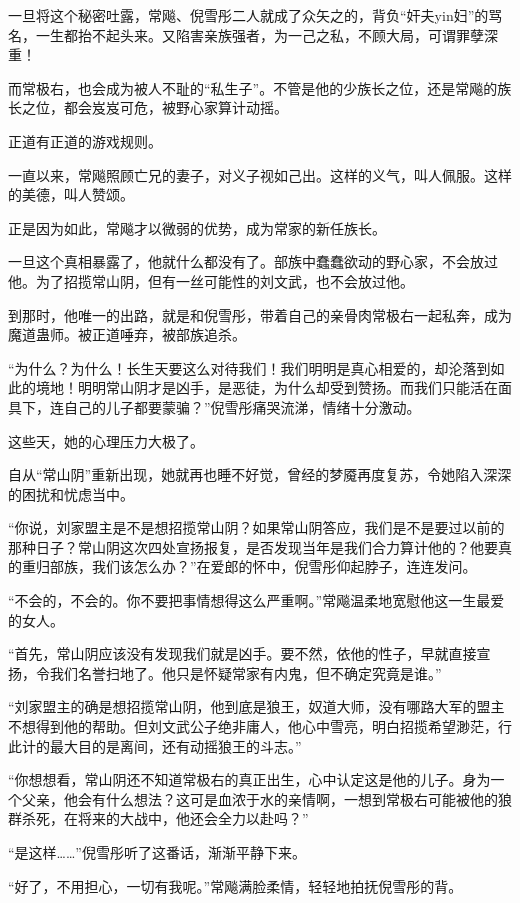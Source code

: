 \begin{this_body}
一旦将这个秘密吐露，常飚、倪雪彤二人就成了众矢之的，背负“奸夫yin妇”的骂名，一生都抬不起头来。又陷害亲族强者，为一己之私，不顾大局，可谓罪孽深重！

而常极右，也会成为被人不耻的“私生子”。不管是他的少族长之位，还是常飚的族长之位，都会岌岌可危，被野心家算计动摇。

正道有正道的游戏规则。

一直以来，常飚照顾亡兄的妻子，对义子视如己出。这样的义气，叫人佩服。这样的美德，叫人赞颂。

正是因为如此，常飚才以微弱的优势，成为常家的新任族长。

一旦这个真相暴露了，他就什么都没有了。部族中蠢蠢欲动的野心家，不会放过他。为了招揽常山阴，但有一丝可能性的刘文武，也不会放过他。

到那时，他唯一的出路，就是和倪雪彤，带着自己的亲骨肉常极右一起私奔，成为魔道蛊师。被正道唾弃，被部族追杀。

“为什么？为什么！长生天要这么对待我们！我们明明是真心相爱的，却沦落到如此的境地！明明常山阴才是凶手，是恶徒，为什么却受到赞扬。而我们只能活在面具下，连自己的儿子都要蒙骗？”倪雪彤痛哭流涕，情绪十分激动。

这些天，她的心理压力大极了。

自从“常山阴”重新出现，她就再也睡不好觉，曾经的梦魇再度复苏，令她陷入深深的困扰和忧虑当中。

“你说，刘家盟主是不是想招揽常山阴？如果常山阴答应，我们是不是要过以前的那种日子？常山阴这次四处宣扬报复，是否发现当年是我们合力算计他的？他要真的重归部族，我们该怎么办？”在爱郎的怀中，倪雪彤仰起脖子，连连发问。

“不会的，不会的。你不要把事情想得这么严重啊。”常飚温柔地宽慰他这一生最爱的女人。

“首先，常山阴应该没有发现我们就是凶手。要不然，依他的性子，早就直接宣扬，令我们名誉扫地了。他只是怀疑常家有内鬼，但不确定究竟是谁。”

“刘家盟主的确是想招揽常山阴，他到底是狼王，奴道大师，没有哪路大军的盟主不想得到他的帮助。但刘文武公子绝非庸人，他心中雪亮，明白招揽希望渺茫，行此计的最大目的是离间，还有动摇狼王的斗志。”

“你想想看，常山阴还不知道常极右的真正出生，心中认定这是他的儿子。身为一个父亲，他会有什么想法？这可是血浓于水的亲情啊，一想到常极右可能被他的狼群杀死，在将来的大战中，他还会全力以赴吗？”

“是这样……”倪雪彤听了这番话，渐渐平静下来。

“好了，不用担心，一切有我呢。”常飚满脸柔情，轻轻地拍抚倪雪彤的背。


\end{this_body}
